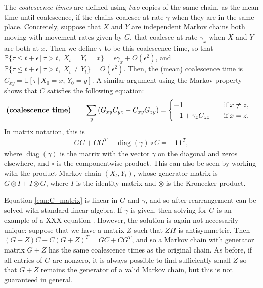 \documentclass{article}
\DeclareMathOperator{\diag}{\mathop{\mbox{diag}}}
\renewcommand{\P}{\mathbb{P}}
\newcommand{\E}{\mathbb{E}}
\newcommand{\given}{\,\vert\,}
\newcommand{\bone}{\mathbf{1}}
\begin{document}
The \emph{coalescence times} are defined using \emph{two} copies of the same chain,
as the mean time until coalescence,
if the chains coalesce at rate $\gamma$ when they are in the same place.
Concretely, 
suppose that $X$ and $Y$ are independent Markov chains both moving with movement rates given by $G$,
that coalesce at rate $\gamma_x$ when $X$ and $Y$ are both at $x$.
Then we define $\tau$ to be this coalescence time,
so that 
$\P\{\tau \le t + \epsilon \given \tau > t, \; X_t = Y_t = x\} = \epsilon \gamma_x + O(\epsilon^2)$,
and 
$\P\{\tau \le t + \epsilon \given \tau > t, \; X_t \neq Y_t\} = O(\epsilon^2)$.
Then, the (mean) coalescence time is $C_{xy} = \E[\tau \given X_0 = x, \, Y_0 = y]$.
A similar argument using the Markov property
shows that $C$ satisfies the following equation:
\begin{align}
\text{\bf (coalescence time)} \qquad
    \sum_y \left(G_{xy} C_{yz} + C_{xy} G_{zy}\right)
    &=
    \begin{cases}
        -1                   \quad & \text{if} \; x \neq z, \\
        -1 + \gamma_z C_{zz} \quad & \text{if} \; x = z.
    \end{cases}
\end{align}
In matrix notation, this is
\begin{align} \label{eqn:C_matrix}
    G C + C G^T - \diag(\gamma) \circ C = -\bone \bone^T,
\end{align}
where $\diag(\gamma)$ is the matrix with the vector $\gamma$ on the diagonal and zeros elsewhere,
and $\circ$ is the componentwise product.
This can also be seen by working with the product Markov chain $(X_t, Y_t)$,
whose generator matrix is $G \otimes I + I \otimes G$,
where $I$ is the identity matrix and $\otimes$ is the Kronecker product.

Equation \eqref{eqn:C_matrix} is linear in $G$ and $\gamma$,
and so after rearrangement can be solved with standard linear algebra.
If $\gamma$ is given, then solving for $G$ is an example of a XXX equation \citep{matrixeqn}.
However, the solution is again not necessarily unique:
suppose that we have a matrix $Z$ such that $ZH$ is antisymmetric.
Then $(G + Z) C + C (G + Z)^T = GC + CG^T$,
and so a Markov chain with generator matrix $G + Z$ has the same coalescence times
as the original chain.
As before, if all entries of $G$ are nonzero, 
it is always possible to find sufficiently small $Z$
so that $G + Z$ remains the generator of a valid Markov chain,
but this is not guaranteed in general.
\end{document}
